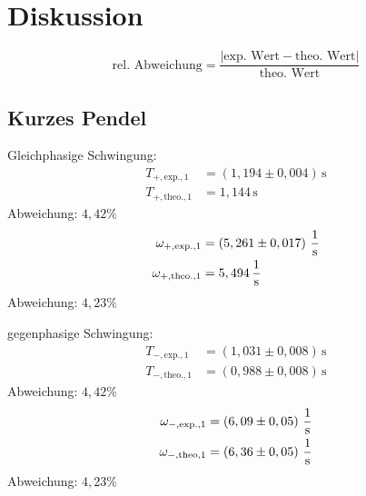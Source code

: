 \section{Diskussion}
\label{sec:Diskussion}
$$\text{rel. Abweichung} = \frac{|\text{exp. Wert} - \text{theo. Wert}|}{\text{theo. Wert}}$$
\subsection{Kurzes Pendel}
Gleichphasige Schwingung:\\
\begin{align*}
    T_{+,\text{exp.}, 1} &= \left( 1,194 \pm 0,004 \right)\,\unit{\second}\\
    T_{+, \text{theo.}, 1} &= 1,144\,\unit{\second}
\end{align*}
Abweichung: $4,42\%$
\begin{align*}
    \omega_{+,\text{exp.}, 1} &=  \left( 5,261 \pm 0,017 \right)\,\unit[per-mode=fraction]{\per \second}\\
    \omega_{+, \text{theo.}, 1} &= 5,494\,\unit[per-mode=fraction]{\per \second}
\end{align*}
Abweichung: $4,23\%$

gegenphasige Schwingung:\\
\begin{align*}
    T_{-,\text{exp.}, 1} &= \left(1,031 \pm 0,008 \right)\, \unit{\second}\\
    T_{-,\text{theo.},1} &= \left( 0,988 \pm 0,008 \right)\, \unit{\second}
\end{align*}
Abweichung: $4,42\%$
\begin{align*}
    \omega_{-,\text{exp.},1} &= \left( 6,09 \pm 0,05 \right)\, \unit[per-mode=fraction]{\per \second}\\
    \omega_{-,\text{theo},1} &= \left( 6,36 \pm 0,05 \right)\,\unit[per-mode=fraction]{\per \second}
\end{align*}
Abweichung: $4,23\%$

